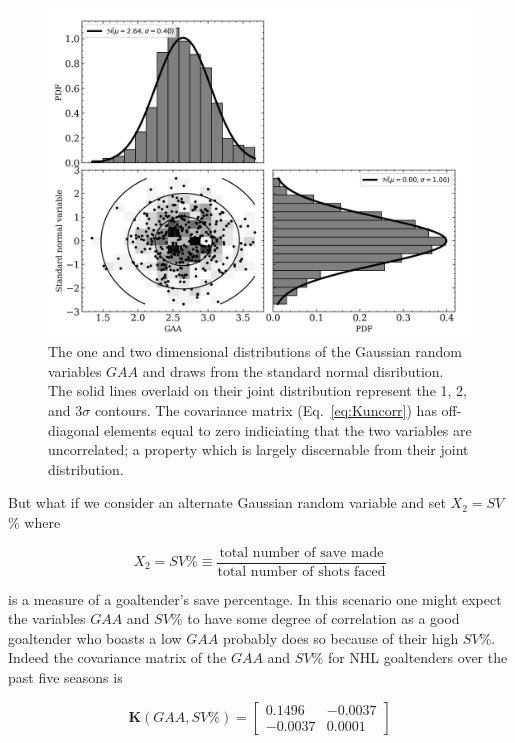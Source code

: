 \begin{figure}
  \centering
  \includegraphics[width=.9\textwidth]{figures/uncorr_2d.png}
  \caption{The one and two dimensional distributions of the Gaussian random
    variables $GAA$ and draws from the standard normal disribution. The solid
    lines overlaid on their joint distribution represent the 1, 2, and 3$\sigma$
    contours. The covariance matrix (Eq.~\ref{eq:Kuncorr}) has off-diagonal
    elements equal to zero indiciating that the two variables are uncorrelated;
    a property which is largely discernable from their joint distribution.}
  \label{fig:uncorr2d}
\end{figure}

But what if we consider an alternate Gaussian random variable and set
$X_2 = SV$\% where

\begin{equation}
  X_2 = SV\% \equiv \frac{\text{total number of save made}}{\text{total number of shots faced}}
\end{equation}

\noindent is a measure of a goaltender's save percentage. In this scenario one
might expect the variables $GAA$ and $SV$\% to have some degree of correlation
as a good goaltender who boasts a low $GAA$ probably does so because of their
high $SV$\%. Indeed the covariance matrix of the $GAA$ and $SV$\% for NHL
goaltenders over the past five seasons is

\begin{equation}
  \mathbf{K}(GAA,SV\%) =
  \begin{bmatrix}
    0.1496 & -0.0037 \\
    -0.0037 & 0.0001
  \end{bmatrix}
  \label{eq:Kcorr}
\end{equation}

